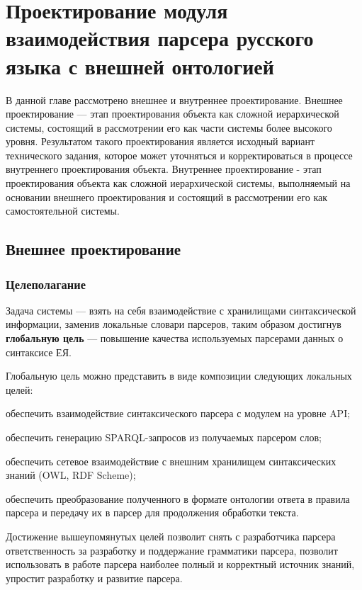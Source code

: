 \indent \section{Проектирование модуля взаимодействия парсера русского языка с внешней онтологией}

В данной главе  рассмотрено внешнее и внутреннее проектирование. Внешнее проектирование --- этап проектирования объекта как сложной иерархической системы, состоящий в рассмотрении его как части системы более высокого уровня. Результатом такого проектирования является исходный вариант технического задания, которое может уточняться и корректироваться в процессе внутреннего проектирования объекта. Внутреннее проектирование - этап проектирования объекта как сложной иерархической системы, выполняемый на основании внешнего проектирования и состоящий в рассмотрении его как самостоятельной системы.

\subsection{Внешнее проектирование}

\subsubsection{Целеполагание}

Задача системы --- взять на себя взаимодействие с хранилищами синтаксической информации, заменив локальные словари парсеров, таким образом достигнув \textbf{глобальную цель} --- повышение качества используемых парсерами данных о синтаксисе ЕЯ.

Глобальную цель можно представить в виде композиции следующих локальных целей:

\begin{list}{}{\leftmargin=1.5cm}
	\item обеспечить взаимодействие синтаксического парсера с модулем на уровне API;
	\item обеспечить генерацию SPARQL-запросов из получаемых парсером слов;
	\item обеспечить сетевое взаимодействие с внешним хранилищем синтаксических знаний (OWL, RDF Scheme);
	\item обеспечить преобразование полученного в формате онтологии ответа в правила парсера и передачу их в парсер для продолжения обработки текста.
\end{list}

Достижение вышеупомянутых целей позволит снять с разработчика парсера ответственность за разработку и поддержание грамматики парсера, позволит использовать в работе парсера наиболее полный и корректный источник знаний, упростит разработку и развитие парсера.

